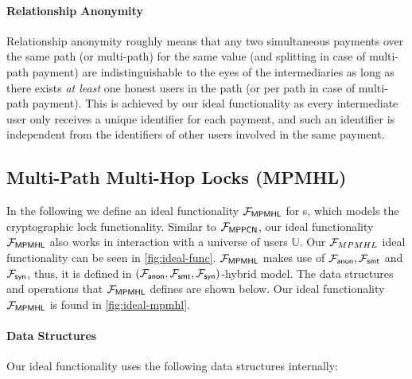\paragraph{Relationship Anonymity}
Relationship anonymity roughly means that any two simultaneous payments over the same path (or 
multi-path) for the same value (and splitting in case of multi-path payment) are 
indistinguishable to the eyes of the intermediaries as long as there exists \emph{at least} 
one honest users in the path (or per path in case of multi-path payment). 
This is achieved by 
our ideal functionality as every intermediate user only receives a unique identifier for 
each payment, and such an identifier is independent from the identifiers of other users involved 
in the same payment.

\subsection{Multi-Path Multi-Hop Locks (MPMHL)}
\label{sec:mpmhl}

In the following we define an ideal functionality $\mathcal{F}_{\mathsf{MPMHL}}$ for {\sysname}s, which 
models the cryptographic lock functionality. Similar to $\mathcal{F}_{\mathsf{MPPCN}}$, our ideal 
functionality $\mathcal{F}_{\mathsf{MPMHL}}$ also works in interaction with a universe of users 
$\mathbb{U}$.  Our $\mathcal{F}_{MPMHL}$ ideal functionality can be seen in \cref{fig:ideal-func}.
$\mathcal{F}_{\mathsf{MPMHL}}$ makes use of $\mathcal{F}_{\mathsf{anon}}, \mathcal{F}_{\mathsf{smt}}$ and $\mathcal{F}_{\mathsf{syn}}$, thus, it is 
defined in $(\mathcal{F}_{\mathsf{anon}}, \mathcal{F}_{\mathsf{smt}}, \mathcal{F}_{\mathsf{syn}})$-hybrid model. The data structures and 
operations that $\mathcal{F}_{\mathsf{MPMHL}}$ defines are shown below. Our ideal functionality 
$\mathcal{F}_{\mathsf{MPMHL}}$ is found in \cref{fig:ideal-mpmhl}.

\paragraph{Data Structures}
Our ideal functionality uses the following data structures internally:

